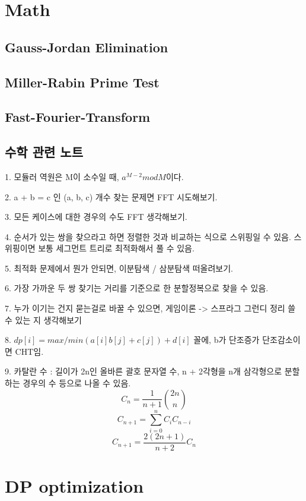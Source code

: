 \documentclass[10pt,landscape,a4paper,twocolumn]{article}
\begin{document}
\section{Math}

\subsection{Gauss-Jordan Elimination}


\subsection{Miller-Rabin Prime Test}


\subsection{Fast-Fourier-Transform}


\subsection{수학 관련 노트}
1. 모듈러 역원은 M이 소수일 때, $a^{M - 2} mod M$이다.


2. a + b = c 인 (a, b, c) 개수 찾는 문제면 FFT 시도해보기.


3. 모든 케이스에 대한 경우의 수도 FFT 생각해보기.


4. 순서가 있는 쌍을 찾으라고 하면 정렬한 것과 비교하는 식으로 스위핑일 수 있음. 스위핑이면 보통 세그먼트 트리로 최적화해서 풀 수 있음.


5. 최적화 문제에서 뭔가 안되면, 이분탐색 / 삼분탐색 떠올려보기.


6. 가장 가까운 두 쌍 찾기는 거리를 기준으로 한 분할정복으로 찾을 수 있음.


7. 누가 이기는 건지 묻는걸로 바꿀 수 있으면, 게임이론 -> 스프라그 그런디 정리 쓸 수 있는 지 생각해보기


8. $ dp[i] = max/min(a[i]b[j] + c[j]) + d[i]$ 꼴에, b가 단조증가 단조감소이면 CHT임.

9. 카탈란 수 : 길이가 2n인 올바른 괄호 문자열 수, n + 2각형을 n개 삼각형으로 분할 하는 경우의 수 등으로 나올 수 있음.
$$ C_n = \frac{1}{n + 1} \binom{2n}{n} $$
$$ C_{n + 1} = \sum_{i=0}^{n} C_i C_{n-i} $$
$$ C_{n + 1} = \frac{2(2n+1)}{n+2} C_n $$

\section{DP optimization}
\end{document}
